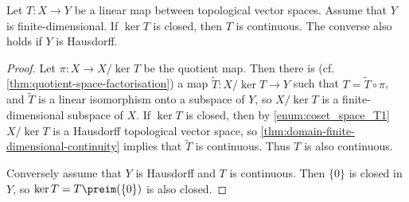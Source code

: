 \documentclass[article, a4paper, 11pt, oneside]{memoir}
\numberwithin{equation}{chapter}
\begin{document}
\begin{theorem}
    Let $T \colon X \to Y$ be a linear map between topological vector spaces. Assume that $Y$ is finite-dimensional. If $\ker T$ is closed, then $T$ is continuous. The converse also holds if $Y$ is Hausdorff.
\end{theorem}

\begin{proof}
    Let $\pi \colon X \to X/\ker T$ be the quotient map. Then there is (cf. \cref{thm:quotient-space-factorisation}) a map $\tilde{T} \colon X/\ker T \to Y$ such that $T = \tilde{T} \circ \pi$, and $\tilde{T}$ is a linear isomorphism onto a subspace of $Y$, so $X/\ker T$ is a finite-dimensional subspace of $X$. If $\ker T$ is closed, then by \cref{enum:coset_space_T1} $X/\ker T$ is a Hausdorff topological vector space, so \cref{thm:domain-finite-dimensional-continuity} implies that $\tilde{T}$ is continuous. Thus $T$ is also continuous.

    Conversely assume that $Y$ is Hausdorff and $T$ is continuous. Then $\{0\}$ is closed in $Y$, so $\ker T = T\preim(\{0\})$ is also closed.
\end{proof}




\end{document}
